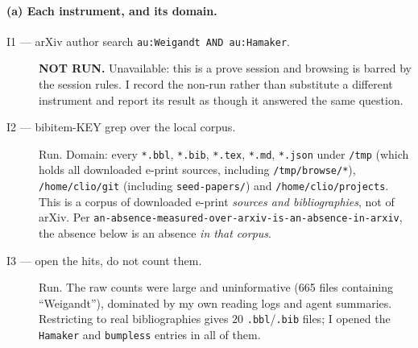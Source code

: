 \documentclass[11pt]{article}
\theoremstyle{definition}
\begin{document}
\paragraph{(a) Each instrument, and its domain.}
\begin{description}
\item[I1 --- arXiv author search \texttt{au:Weigandt AND au:Hamaker}.]
  \textbf{NOT RUN.}  Unavailable: this is a prove session and browsing is barred
  by the session rules.  I record the non-run rather than substitute a different
  instrument and report its result as though it answered the same question.
\item[I2 --- bibitem-KEY grep over the local corpus.]  Run.  Domain: every
  \texttt{*.bbl}, \texttt{*.bib}, \texttt{*.tex}, \texttt{*.md}, \texttt{*.json}
  under \texttt{/tmp} (which holds all downloaded e-print sources, including
  \texttt{/tmp/browse/*}), \texttt{/home/clio/git} (including
  \texttt{seed-papers/}) and \texttt{/home/clio/projects}.  This is a corpus of
  downloaded e-print \emph{sources and bibliographies}, not of arXiv.
  Per \texttt{an-absence-measured-over-arxiv-is-an-absence-in-arxiv}, the
  absence below is an absence \emph{in that corpus}.
\item[I3 --- open the hits, do not count them.]  Run.  The raw counts were large
  and uninformative (665 files containing ``Weigandt''), dominated by my own
  reading logs and agent summaries.  Restricting to real bibliographies gives
  $20$ \texttt{.bbl}/\texttt{.bib} files; I opened the \texttt{Hamaker} and
  \texttt{bumpless} entries in all of them.
\end{description}
\end{document}
